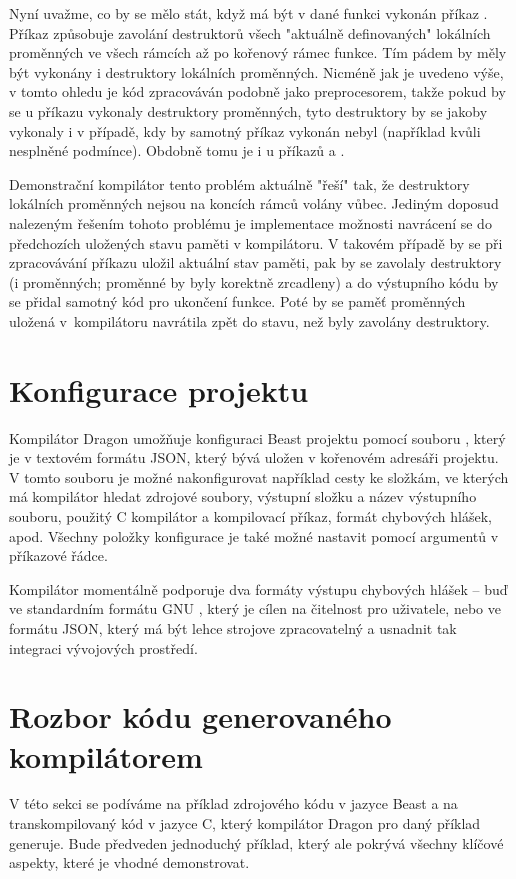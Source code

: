 Nyní uvažme, co by se mělo stát, když má být v dané funkci vykonán příkaz . Příkaz  způsobuje zavolání destruktorů všech "aktuálně definovaných" lokálních proměnných ve všech rámcích až po kořenový rámec funkce. Tím pádem by měly být vykonány i destruktory lokálních \ctime proměnných. Nicméně jak je uvedeno výše, v tomto ohledu je \ctime kód zpracováván podobně jako preprocesorem, takže pokud by se u příkazu  vykonaly destruktory \ctime proměnných, tyto destruktory by se jakoby vykonaly i v případě, kdy by samotný příkaz  vykonán nebyl (například kvůli nesplněné podmínce). Obdobně tomu je i u příkazů  a .

Demonstrační kompilátor tento problém aktuálně "řeší" tak, že destruktory lokálních \ctime proměnných nejsou na koncích rámců volány vůbec. Jediným doposud nalezeným řešením tohoto problému je implementace možnosti navrácení se do předchozích uložených stavu \ctime paměti v kompilátoru. V takovém případě by se při zpracovávání příkazu  uložil aktuální stav paměti, pak by se zavolaly destruktory (\nonctime i \ctime proměnných; \ctime proměnné by byly korektně zrcadleny) a do výstupního kódu by se přidal samotný kód pro ukončení funkce. Poté by se paměť \ctime proměnných uložená v~kompilátoru navrátila zpět do stavu, než byly zavolány destruktory.

\section{Konfigurace projektu}
Kompilátor Dragon umožňuje konfiguraci Beast projektu pomocí souboru , který je v textovém formátu JSON, který bývá uložen v kořenovém adresáři projektu. V tomto souboru je možné nakonfigurovat například cesty ke složkám, ve kterých má kompilátor hledat zdrojové soubory, výstupní složku a název výstupního souboru, použitý C kompilátor a kompilovací příkaz, formát chybových hlášek, apod. Všechny položky konfigurace je také možné nastavit pomocí argumentů v příkazové řádce.

Kompilátor momentálně podporuje dva formáty výstupu chybových hlášek -- buď ve standardním formátu GNU \cite{GNUErrors}, který je cílen na čitelnost pro uživatele, nebo ve formátu JSON, který má být lehce strojove zpracovatelný a usnadnit tak integraci vývojových prostředí.

\section{Rozbor kódu generovaného kompilátorem}
V této sekci se podíváme na příklad zdrojového kódu v jazyce Beast a na transkompilovaný kód v jazyce C, který kompilátor Dragon pro daný příklad generuje. Bude předveden jednoduchý příklad, který ale pokrývá všechny klíčové aspekty, které je vhodné demonstrovat.

